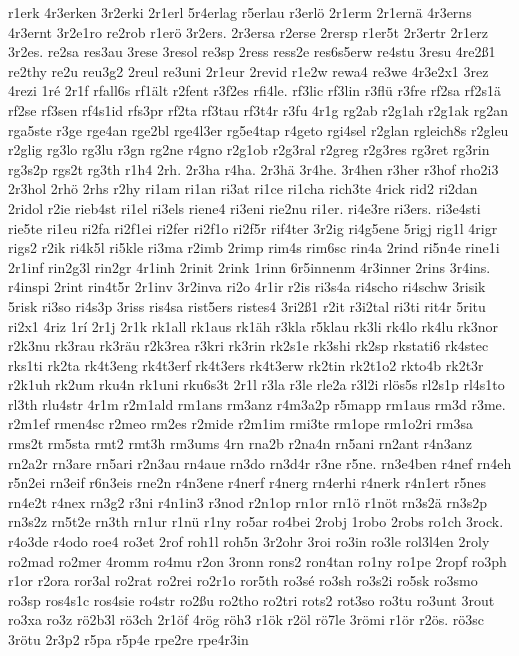{r1erk
4r3erken
3r2erki
2r1erl
5r4erlag
r5erlau
r3erlö
2r1erm
2r1ernä
4r3erns
4r3ernt
3r2e1ro
re2rob
r1erö
3r2ers.
2r3ersa
r2erse
2rersp
r1er5t
2r3ertr
2r1erz
3r2es.
re2sa
res3au
3rese
3resol
re3sp
2ress
ress2e
res6s5erw
re4stu
3resu
4re2ß1
re2thy
re2u
reu3g2
2reul
re3uni
2r1eur
2revid
r1e2w
rewa4
re3we
4r3e2x1
3rez
4rezi
1ré
2r1f
rfall6s
rf1ält
r2fent
r3f2es
rfi4le.
rf3lic
rf3lin
r3flü
r3fre
rf2sa
rf2s1ä
rf2se
rf3sen
rf4s1id
rfs3pr
rf2ta
rf3tau
rf3t4r
r3fu
4r1g
rg2ab
r2g1ah
r2g1ak
rg2an
rga5ste
r3ge
rge4an
rge2bl
rge4l3er
rg5e4tap
r4geto
rgi4sel
r2glan
rgleich8s
r2gleu
r2glig
rg3lo
rg3lu
r3gn
rg2ne
r4gno
r2g1ob
r2g3ral
r2greg
r2g3res
rg3ret
rg3rin
rg3s2p
rgs2t
rg3th
r1h4
2rh.
2r3ha
r4ha.
2r3hä
3r4he.
3r4hen
r3her
r3hof
rho2i3
2r3hol
2rhö
2rhs
r2hy
ri1am
ri1an
ri3at
ri1ce
ri1cha
rich3te
4rick
rid2
ri2dan
2ridol
r2ie
rieb4st
ri1el
ri3els
riene4
ri3eni
rie2nu
ri1er.
ri4e3re
ri3ers.
ri3e4sti
rie5te
ri1eu
ri2fa
ri2f1ei
ri2fer
ri2f1o
ri2f5r
rif4ter
3r2ig
ri4g5ene
5rigj
rig1l
4rigr
rigs2
r2ik
ri4k5l
ri5kle
ri3ma
r2imb
2rimp
rim4s
rim6sc
rin4a
2rind
ri5n4e
rine1i
2r1inf
rin2g3l
rin2gr
4r1inh
2rinit
2rink
1rinn
6r5innenm
4r3inner
2rins
3r4ins.
r4inspi
2rint
rin4t5r
2r1inv
3r2inva
ri2o
4r1ir
r2is
ri3s4a
ri4scho
ri4schw
3risik
5risk
ri3so
ri4s3p
3riss
ris4sa
rist5ers
ristes4
3ri2ß1
r2it
r3i2tal
ri3ti
rit4r
5ritu
ri2x1
4riz
1rí
2r1j
2r1k
rk1all
rk1aus
rk1äh
r3kla
r5klau
rk3li
rk4lo
rk4lu
rk3nor
r2k3nu
rk3rau
rk3räu
r2k3rea
r3kri
rk3rin
rk2s1e
rk3shi
rk2sp
rkstati6
rk4stec
rks1ti
rk2ta
rk4t3eng
rk4t3erf
rk4t3ers
rk4t3erw
rk2tin
rk2t1o2
rkto4b
rk2t3r
r2k1uh
rk2um
rku4n
rk1uni
rku6s3t
2r1l
r3la
r3le
rle2a
r3l2i
rlös5s
rl2s1p
rl4s1to
rl3th
rlu4str
4r1m
r2m1ald
rm1ans
rm3anz
r4m3a2p
r5mapp
rm1aus
rm3d
r3me.
r2m1ef
rmen4sc
r2meo
rm2es
r2mide
r2m1im
rmi3te
rm1ope
rm1o2ri
rm3sa
rms2t
rm5sta
rmt2
rmt3h
rm3ums
4rn
rna2b
r2na4n
rn5ani
rn2ant
r4n3anz
rn2a2r
rn3are
rn5ari
r2n3au
rn4aue
rn3do
rn3d4r
r3ne
r5ne.
rn3e4ben
r4nef
rn4eh
r5n2ei
rn3eif
r6n3eis
rne2n
r4n3ene
r4nerf
r4nerg
rn4erhi
r4nerk
r4n1ert
r5nes
rn4e2t
r4nex
rn3g2
r3ni
r4n1in3
r3nod
r2n1op
rn1or
rn1ö
r1nöt
rn3s2ä
rn3s2p
rn3s2z
rn5t2e
rn3th
rn1ur
r1nü
r1ny
ro5ar
ro4bei
2robj
1robo
2robs
ro1ch
3rock.
r4o3de
r4odo
roe4
ro3et
2rof
roh1l
roh5n
3r2ohr
3roi
ro3in
ro3le
rol3l4en
2roly
ro2mad
ro2mer
4romm
ro4mu
r2on
3ronn
rons2
ron4tan
ro1ny
ro1pe
2ropf
ro3ph
r1or
r2ora
ror3al
ro2rat
ro2rei
ro2r1o
ror5th
ro3sé
ro3sh
ro3s2i
ro5sk
ro3smo
ro3sp
ros4s1c
ros4sie
ro4str
ro2ßu
ro2tho
ro2tri
rots2
rot3so
ro3tu
ro3unt
3rout
ro3xa
ro3z
rö2b3l
rö3ch
2r1öf
4rög
röh3
r1ök
r2öl
rö7le
3römi
r1ör
r2ös.
rö3sc
3rötu
2r3p2
r5pa
r5p4e
rpe2re
rpe4r3in
}
